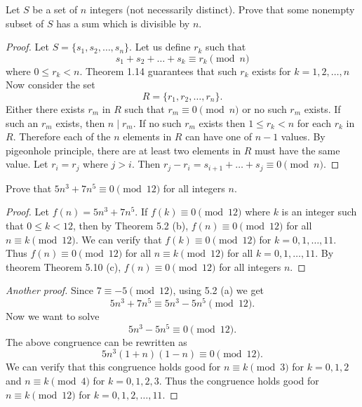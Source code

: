 
\begin{exercise}{5.1}
  Let \( S \) be a set of \( n \) integers (not necessarily distinct).
  Prove that some nonempty subset of \( S \) has a sum which is
  divisible by \( n \).
\end{exercise}

\begin{proof}
  Let \( S = \{ s_1, s_2, \dots, s_n \} \). Let us define \( r_k \)
  such that
  \[
  s_1 + s_2 + \dots + s_k \equiv r_k \pmod{n}
  \]
  where \( 0 \le r_k < n \). Theorem 1.14 guarantees that such \( r_k
  \) exists for \( k = 1, 2, \dots, n \) Now consider the set
  \[
  R = \{ r_1, r_2, \dots, r_n \}.
  \]
  Either there exists \( r_m \) in \( R \) such that \( r_m \equiv 0
  \pmod{n} \) or no such \( r_m \) exists. If such an \( r_m \)
  exists, then \( n \mid r_m \). If no such \( r_m \) exists then \( 1
  \le r_k < n \) for each \( r_k \) in \( R \). Therefore each of the
  \( n \) elements in \( R \) can have one of \( n - 1 \) values. By
  pigeonhole principle, there are at least two elements in \( R \)
  must have the same value. Let \( r_i = r_j \) where \( j > i \).
  Then \( r_j - r_i = s_{i + 1} + \dots + s_{j} \equiv 0
  \pmod{n} \).
\end{proof}


\begin{exercise}{5.2}
  Prove that \( 5n^3 + 7n^5 \equiv 0 \pmod{12} \) for all integers \( n \).
\end{exercise}

\begin{proof}
  Let \( f(n) = 5n^3 + 7n^5 \). If \( f(k) \equiv 0 \pmod{12} \) where
  \( k \) is an integer such that \( 0 \le k < 12 \), then by Theorem
  5.2 (b), \( f(n) \equiv 0 \pmod{12} \) for all \( n \equiv k
  \pmod{12} \). We can verify that \( f(k) \equiv 0 \pmod{12} \) for
  \( k = 0, 1, \dots, 11 \). Thus \( f(n) \equiv 0 \pmod{12} \) for
  all \( n \equiv k \pmod{12} \) for all \( k = 0, 1, \dots, 11 \). By
  theorem Theorem 5.10 (c), \( f(n) \equiv 0 \pmod{12} \) for all
  integers \( n \).
\end{proof}

\begin{proof}[Another proof]
  Since \( 7 \equiv -5 \pmod{12} \), using 5.2 (a) we get
  \[ 5n^3 + 7n^5 \equiv 5n^3 - 5n^5 \pmod{12}. \]
  Now we want to solve
  \[ 5n^3 - 5n^5 \equiv 0 \pmod{12}. \]
  The above congruence can be rewritten as
  \[ 5n^3 (1 + n) (1 - n) \equiv 0 \pmod{12}. \]
  We can verify that this congruence holds good for \( n \equiv k
  \pmod{3} \) for \( k = 0, 1, 2 \) and \( n \equiv k \pmod{4} \) for
  \( k = 0, 1, 2, 3 \). Thus the congruence holds good for \( n \equiv
  k \pmod{12} \) for \( k = 0, 1, 2, \dots, 11 \).
\end{proof}


